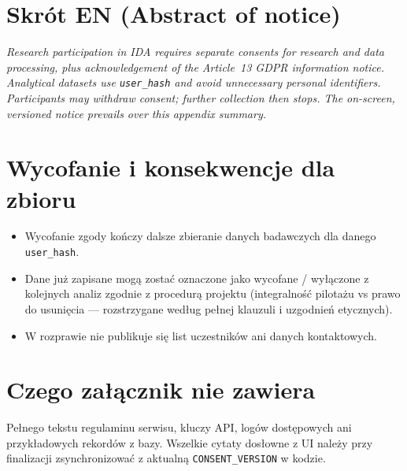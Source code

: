\section{Skrót EN (Abstract of notice)}
\label{app:f:sec:art13-en}

\emph{Research participation in IDA requires separate consents for research and data processing, plus acknowledgement of the Article~13 GDPR information notice. Analytical datasets use \texttt{user\_hash} and avoid unnecessary personal identifiers. Participants may withdraw consent; further collection then stops. The on-screen, versioned notice prevails over this appendix summary.}

\section{Wycofanie i konsekwencje dla zbioru}
\label{app:f:sec:wycofanie}

\begin{itemize}
  \item Wycofanie zgody kończy dalsze zbieranie danych badawczych dla danego \texttt{user\_hash}.
  \item Dane już zapisane mogą zostać oznaczone jako wycofane / wyłączone z kolejnych analiz zgodnie z procedurą projektu (integralność pilotażu vs prawo do usunięcia --- rozstrzygane według pełnej klauzuli i uzgodnień etycznych).
  \item W rozprawie nie publikuje się list uczestników ani danych kontaktowych.
\end{itemize}

\section{Czego załącznik nie zawiera}
\label{app:f:sec:braki}

Pełnego tekstu regulaminu serwisu, kluczy API, logów dostępowych ani przykładowych rekordów z bazy. Wszelkie cytaty dosłowne z UI należy przy finalizacji zsynchronizować z aktualną \texttt{CONSENT\_VERSION} w kodzie.
